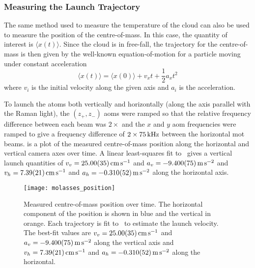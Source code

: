 \subsubsection{Measuring the Launch Trajectory}
The same method used to measure the temperature of the cloud can also
be used to measure the position of the centre-of-mass. In this case,
the quantity of interest is \(\langle x(t)\rangle\). Since the cloud
is in free-fall, the trajectory for the centre-of-mass is then given
by the well-known equation-of-motion for a particle moving under
constant acceleration
\begin{equation}
    \langle x(t) \rangle = \langle x(0) \rangle + v_x t + \frac{1}{2} a_x t^2
    \label{eq:position_free}
\end{equation}
where \(v_i\) is the initial velocity along the given axis and \(a_i\)
is the acceleration.
\par\noindent
To launch the atoms both vertically and horizontally (along the axis
parallel with the Raman light), the \((z_+, z_-)\) \acp{aom} were
ramped so that the relative frequency difference between each beam was
\(2\times\) and the \(x\) and \(y\) \ac{aom}
frequencies were ramped to give a frequency difference of \(2\times
\sivalue{75}{\kilo\hertz}\) between the horizontal \ac{mot} beams.
 is a plot of the measured
centre-of-mass position along the horizontal and vertical camera axes
over time. A linear least-squares fit
to~ gives a vertical launch quantities
of \(v_v = \sivalue{25.0\pm0.35}{\centi\meter\per\second}\) and \(a_v
= \sivalue{-9.40\pm0.075}{\metre\per\second\squared}\) and \(v_h =
\sivalue{7.39\pm0.21}{\centi\meter\per\second}\) and \(a_h =
\sivalue{-0.31\pm0.052}{\metre\per\second\squared}\) along the
horizontal axis. 
\begin{figure}[!htbp]
    \centering
    \texttt{[image: molasses\_position]}
    \caption[Atom cloud centre-of-mass over time]{Measured centre-of-mass position over time. The horizontal component of the position is shown in blue and the vertical in orange. Each trajectory is fit to~ to estimate the launch velocity. The best-fit values are \(v_v = \sivalue{25.0\pm0.35}{\centi\meter\per\second}\) and \(a_v = \sivalue{-9.40\pm0.075}{\metre\per\second\squared}\) along the vertical axis and \(v_h = \sivalue{7.39\pm0.21}{\centi\meter\per\second}\) and \(a_h = \sivalue{-0.31\pm0.052}{\metre\per\second\squared}\) along the horizontal.}
    \label{fig:molasses_position}
\end{figure}
